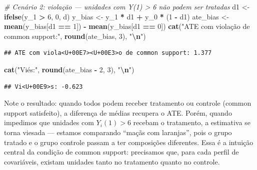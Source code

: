 \documentclass[
]{article}
\newenvironment{Shaded}{\begin{snugshade}}{\end{snugshade}}
\newcommand{\CommentTok}[1]{\textcolor[rgb]{0.56,0.35,0.01}{\textit{#1}}}
\newcommand{\DecValTok}[1]{\textcolor[rgb]{0.00,0.00,0.81}{#1}}
\newcommand{\FunctionTok}[1]{\textcolor[rgb]{0.13,0.29,0.53}{\textbf{#1}}}
\newcommand{\NormalTok}[1]{#1}
\newcommand{\OtherTok}[1]{\textcolor[rgb]{0.56,0.35,0.01}{#1}}
\newcommand{\SpecialCharTok}[1]{\textcolor[rgb]{0.81,0.36,0.00}{\textbf{#1}}}
\newcommand{\StringTok}[1]{\textcolor[rgb]{0.31,0.60,0.02}{#1}}
\begin{document}
\begin{Shaded}
\begin{Highlighting}[]
\CommentTok{\# Cenário 2: violação — unidades com Y(1) \textgreater{} 6 não podem ser tratadas}
\NormalTok{d1 }\OtherTok{\textless{}{-}} \FunctionTok{ifelse}\NormalTok{(y\_1 }\SpecialCharTok{\textgreater{}} \DecValTok{6}\NormalTok{, }\DecValTok{0}\NormalTok{, d)}
\NormalTok{y\_bias }\OtherTok{\textless{}{-}}\NormalTok{ y\_1 }\SpecialCharTok{*}\NormalTok{ d1 }\SpecialCharTok{+}\NormalTok{ y\_0 }\SpecialCharTok{*}\NormalTok{ (}\DecValTok{1} \SpecialCharTok{{-}}\NormalTok{ d1)}
\NormalTok{ate\_bias }\OtherTok{\textless{}{-}} \FunctionTok{mean}\NormalTok{(y\_bias[d1 }\SpecialCharTok{==} \DecValTok{1}\NormalTok{]) }\SpecialCharTok{{-}} \FunctionTok{mean}\NormalTok{(y\_bias[d1 }\SpecialCharTok{==} \DecValTok{0}\NormalTok{])}
\FunctionTok{cat}\NormalTok{(}\StringTok{"ATE com violação de common support:"}\NormalTok{, }\FunctionTok{round}\NormalTok{(ate\_bias, }\DecValTok{3}\NormalTok{), }\StringTok{"}\SpecialCharTok{\textbackslash{}n}\StringTok{"}\NormalTok{)}
\end{Highlighting}
\end{Shaded}

\begin{verbatim}
## ATE com viola<U+00E7><U+00E3>o de common support: 1.377
\end{verbatim}

\begin{Shaded}
\begin{Highlighting}[]
\FunctionTok{cat}\NormalTok{(}\StringTok{"Viés:"}\NormalTok{, }\FunctionTok{round}\NormalTok{(ate\_bias }\SpecialCharTok{{-}} \DecValTok{2}\NormalTok{, }\DecValTok{3}\NormalTok{), }\StringTok{"}\SpecialCharTok{\textbackslash{}n}\StringTok{"}\NormalTok{)}
\end{Highlighting}
\end{Shaded}

\begin{verbatim}
## Vi<U+00E9>s: -0.623
\end{verbatim}

Note o resultado: quando todos podem receber tratamento ou controle (common support satisfeito), a diferença de médias recupera o ATE. Porém, quando impedimos que unidades com \(Y_i(1) > 6\) recebam o tratamento, a estimativa se torna viesada --- estamos comparando ``maçãs com laranjas'', pois o grupo tratado e o grupo controle passam a ter composições diferentes. Essa é a intuição central da condição de common support: precisamos que, para cada perfil de covariáveis, existam unidades tanto no tratamento quanto no controle.
\end{document}
